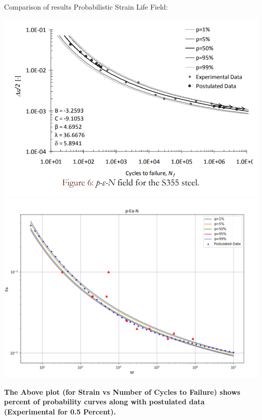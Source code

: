 \documentclass[11pt]{article}
\begin{document}
Comparison of results Probabilistic Strain Life Field:
\begin{center}
\includegraphics[scale=0.9]{images/p_e_n_paper.PNG}
\includegraphics[scale=0.9]{images/p_e_n_model.PNG}
\end{center}

\textbf{The Above plot (for Strain vs Number of Cycles to Failure) shows
percent of probability curves along with postulated data (Experimental
for 0.5 Percent).}
\end{document}
